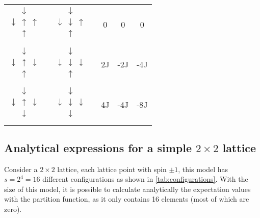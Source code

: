 \documentclass[../main.tex]{subfiles}
\begin{document}
\begin{table}[!htb]
\begin{center}
\begin{tabular}{ c c c c c}
$\begin{matrix}& \downarrow & \\ \downarrow & \uparrow & \uparrow \\ & \uparrow & \\ & & & \end{matrix}$     & $\begin{matrix}& \downarrow & \\ \downarrow & \downarrow & \uparrow \\ & \uparrow & \\ & & & \end{matrix}$ & 0 & 0   & 0                  \\
$\begin{matrix}& \downarrow & \\ \downarrow & \uparrow & \downarrow \\ & \uparrow & \\ & & & \end{matrix}$   & $\begin{matrix}& \downarrow & \\ \downarrow & \downarrow & \downarrow \\ & \uparrow & \\ & & & \end{matrix}$ & 2J & -2J  & -4J                 \\
$\begin{matrix}& \downarrow & \\ \downarrow & \uparrow & \downarrow \\ & \downarrow & \\ & & & \end{matrix}$ & $\begin{matrix}& \downarrow & \\ \downarrow & \downarrow & \downarrow \\ & \downarrow & \\ & & & \end{matrix}$ & 4J & -4J & -8J                 \\ 

\bottomrule
\end{tabular}
\end{center}
\label{tab:possible-delta-E}
\end{table}

\subsection{Analytical expressions for a simple \ensuremath{2\times2} lattice}
Consider a $2\times2$ lattice, each lattice point with spin $\pm1$, this model has \ensuremath{s=2^4=16} different configurations as shown in \cref{tab:configurations}. With the size of this model, it is possible to calculate analytically the expectation values with the partition function, as it only contains 16 elements (most of which are zero).
\end{document}

